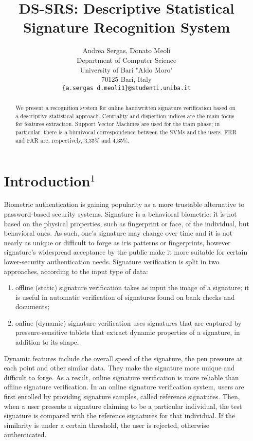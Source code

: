 \documentclass[a4paper, 10pt, conference]{IEEEconf}
\title{\LARGE \bf DS-SRS: Descriptive Statistical Signature Recognition System}
\author{ 
	\parbox{3 in}{\centering Andrea Sergas, Donato Meoli \\
	Department of Computer Science \\ University of Bari "Aldo Moro" \\ 70125 Bari, Italy \\
    {\tt\small \{a.sergas d.meoli1\}@studenti.uniba.it}}
}
\begin{document}
\maketitle
\thispagestyle{empty}
\pagestyle{empty}

\begin{abstract}
We present a recognition system for online handwritten signature verification based on a descriptive statistical approach. Centrality and dispertion indices are the main focus for features extraction. Support Vector Machines are used for the train phase; in particular, there is a biunivocal correspondence between the SVMs and the users. FRR and FAR are, respectively, 3,35\% and 4,35\%.
\end{abstract}

\section{Introduction$^{1}$}
Biometric authentication is gaining popularity as a more trustable alternative to password-based security systems. Signature is a behavioral biometric: it is not based on the physical properties, such as fingerprint or face, of the individual, but behavioral ones. As such, one’s signature may change over time and it is not nearly as unique or difficult to forge as iris patterns or fingerprints, however signature’s widespread acceptance by the public make it more suitable for certain lower-security authentication needs. \newline
Signature verification is split in two approaches, according to the input type of data: 
\begin{enumerate}[label=(\roman*)]
\item
	offline (static) signature verification takes as input the image of a signature; it is useful in automatic verification of signatures found on bank checks and documents;
\item 
	online (dynamic) signature verification uses signatures that are captured by pressure-sensitive tablets that extract dynamic properties of a signature, in addition to its shape.
\end{enumerate}
Dynamic features include the overall speed of the signature, the pen pressure at each point and other similar data. They make the signature more unique and difficult to forge. As a result, online signature verification is more reliable than offline signature verification. \newline
In an online signature verification system, users are first enrolled by providing signature samples, called reference signatures. Then, when a user presents a signature claiming to be a particular individual, the test signature is compared with the reference signatures for that individual. If the similarity is under a certain threshold, the user is rejected, otherwise authenticated.
\end{document}
